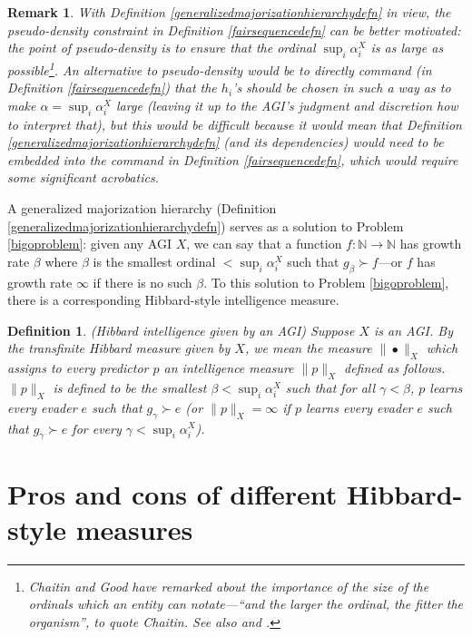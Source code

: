\documentclass{article}
\newtheorem{definition}[theorem]{Definition}
\newtheorem{remark}[theorem]{Remark}
\begin{document}
\begin{remark}
\label{pseudodensityremark}
With Definition \ref{generalizedmajorizationhierarchydefn} in view,
the pseudo-density
constraint in Definition \ref{fairsequencedefn} can be better motivated:
the point of pseudo-density is to ensure that the ordinal
$\sup_i \alpha^X_i$ is as large as possible\footnote{Chaitin \cite{chaitin}
and Good \cite{good1969godel} have remarked
about the importance of the size of the ordinals which an entity can notate---``and
the larger the ordinal,
the fitter the organism'', to quote Chaitin. See also \cite{ioi1} and \cite{ioi2}.}. An
alternative to pseudo-density would
be to directly command (in Definition \ref{fairsequencedefn}) that the $h_i$'s should
be chosen in such a way as to make $\alpha=\sup_i\alpha^X_i$ large (leaving it up
to the AGI's judgment and discretion how to interpret that), but this would be
difficult because it would mean that Definition \ref{generalizedmajorizationhierarchydefn}
(and its dependencies) would need to be embedded into the command in
Definition \ref{fairsequencedefn}, which would require some significant acrobatics.
\end{remark}

A generalized majorization hierarchy (Definition \ref{generalizedmajorizationhierarchydefn})
serves as a solution to Problem \ref{bigoproblem}: given any AGI $X$, we can say
that a function $f:\mathbb N\to\mathbb N$ has growth rate
$\beta$ where $\beta$ is the smallest ordinal $<\sup_i \alpha^X_i$
such that $g_\beta\succ f$---or $f$ has growth rate $\infty$ if there is no
such $\beta$. To this solution to Problem \ref{bigoproblem}, there is a corresponding
Hibbard-style intelligence measure.

\begin{definition}
    (Hibbard intelligence given by an AGI)
    Suppose $X$ is an AGI. By the \emph{transfinite Hibbard measure given by $X$},
    we mean the measure $\|\bullet\|_X$ which assigns to every predictor $p$ an
    intelligence measure $\|p\|_X$ defined as follows.
    $\|p\|_X$ is defined to be the smallest $\beta<\sup_i\alpha^X_i$
    such that for all $\gamma<\beta$,
    $p$ learns every evader $e$ such that $g_\gamma\succ e$
    (or $\|p\|_X=\infty$ if
    $p$ learns every evader $e$ such that $g_\gamma\succ e$ for every
    $\gamma<\sup_i \alpha^X_i$).
\end{definition}

\section{Pros and cons of different Hibbard-style measures}
\label{prosandconssection}
\end{document}
